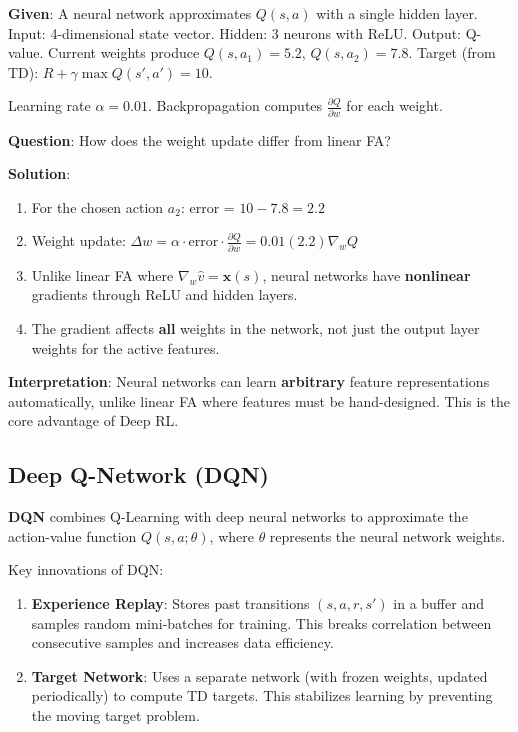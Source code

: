 \documentclass[11pt,a4paper]{article}
\begin{document}
\begin{tcolorbox}[colback=green!5!white,colframe=green!75!black,title=\textbf{Worked Example 42: Neural Network Value Estimation}]
\textbf{Given}: A neural network approximates $Q(s, a)$ with a single hidden layer. Input: 4-dimensional state vector. Hidden: 3 neurons with ReLU. Output: Q-value. Current weights produce $Q(s, a_1) = 5.2$, $Q(s, a_2) = 7.8$. Target (from TD): $R + \gamma \max Q(s', a') = 10$.

Learning rate $\alpha = 0.01$. Backpropagation computes $\frac{\partial Q}{\partial w}$ for each weight.

\textbf{Question}: How does the weight update differ from linear FA?

\textbf{Solution}:
\begin{enumerate}
    \item For the chosen action $a_2$: error = $10 - 7.8 = 2.2$
    \item Weight update: $\Delta w = \alpha \cdot \text{error} \cdot \frac{\partial Q}{\partial w} = 0.01(2.2) \nabla_w Q$
    \item Unlike linear FA where $\nabla_w \hat{v} = \mathbf{x}(s)$, neural networks have \textbf{nonlinear} gradients through ReLU and hidden layers.
    \item The gradient affects \textbf{all} weights in the network, not just the output layer weights for the active features.
\end{enumerate}

\textbf{Interpretation}: Neural networks can learn \textbf{arbitrary} feature representations automatically, unlike linear FA where features must be hand-designed. This is the core advantage of Deep RL.
\end{tcolorbox}

\subsection{Deep Q-Network (DQN)}

\textbf{DQN} combines Q-Learning with deep neural networks to approximate the action-value function $Q(s, a; \theta)$, where $\theta$ represents the neural network weights.

Key innovations of DQN:
\begin{enumerate}
    \item \textbf{Experience Replay}: Stores past transitions $(s, a, r, s')$ in a buffer and samples random mini-batches for training. This breaks correlation between consecutive samples and increases data efficiency.
    \item \textbf{Target Network}: Uses a separate network (with frozen weights, updated periodically) to compute TD targets. This stabilizes learning by preventing the moving target problem.
\end{enumerate}
\end{document}
